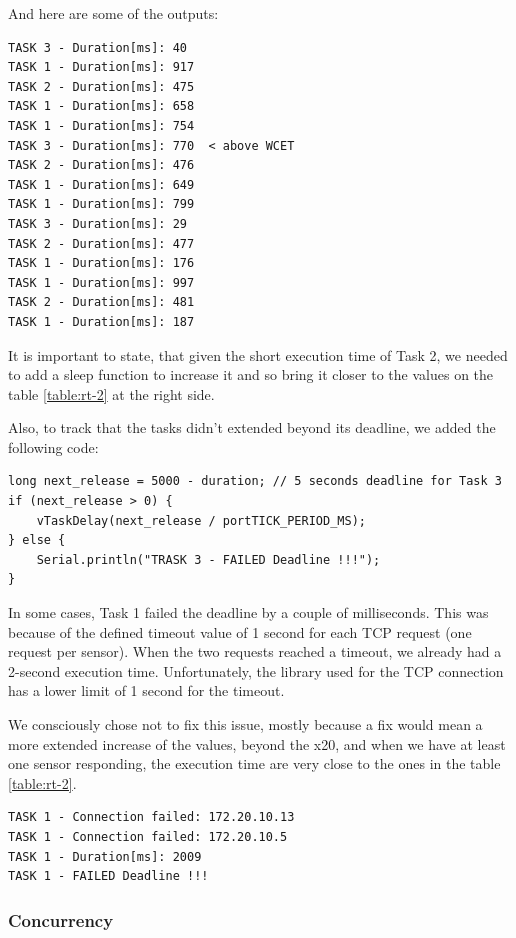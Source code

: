 \documentclass[11pt]{article}
\begin{document}
\noindent
And here are some of the outputs:

\begin{verbatim}
TASK 3 - Duration[ms]: 40
TASK 1 - Duration[ms]: 917
TASK 2 - Duration[ms]: 475
TASK 1 - Duration[ms]: 658
TASK 1 - Duration[ms]: 754
TASK 3 - Duration[ms]: 770  < above WCET
TASK 2 - Duration[ms]: 476
TASK 1 - Duration[ms]: 649
TASK 1 - Duration[ms]: 799
TASK 3 - Duration[ms]: 29
TASK 2 - Duration[ms]: 477
TASK 1 - Duration[ms]: 176
TASK 1 - Duration[ms]: 997
TASK 2 - Duration[ms]: 481
TASK 1 - Duration[ms]: 187
\end{verbatim}

It is important to state, that given the short execution time of Task 2, we needed to add a sleep function to increase it and so bring it closer to the values on the table \ref{table:rt-2} at the right side.

Also, to track that the tasks didn't extended beyond its deadline, we added the following code:

\begin{verbatim}
long next_release = 5000 - duration; // 5 seconds deadline for Task 3
if (next_release > 0) {
    vTaskDelay(next_release / portTICK_PERIOD_MS);
} else {
    Serial.println("TRASK 3 - FAILED Deadline !!!");
}
\end{verbatim}

In some cases, Task 1 failed the deadline by a couple of milliseconds. This was because of the defined timeout value of 1 second for each TCP request (one request per sensor). When the two requests reached a timeout, we already had a 2-second execution time. Unfortunately, the library used for the TCP connection has a lower limit of 1 second for the timeout. 

We consciously chose not to fix this issue, mostly because a fix would mean a more extended increase of the values, beyond the x20, and when we have at least one sensor responding, the execution time are very close to the ones in the table \ref{table:rt-2}.

\begin{verbatim}
TASK 1 - Connection failed: 172.20.10.13
TASK 1 - Connection failed: 172.20.10.5
TASK 1 - Duration[ms]: 2009
TASK 1 - FAILED Deadline !!!
\end{verbatim}

\subsubsection{Concurrency}
\end{document}
